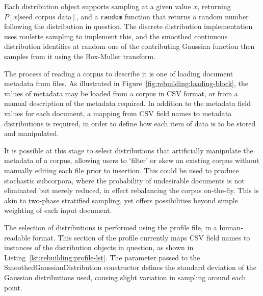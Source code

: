 Each distribution object supports sampling at a given value $x$, returning $P[x | \text{seed corpus data}]$, and a \texttt{random} function that returns a random number following the distribution in question.  The discrete distribution implementation uses roulette sampling to implement this, and the smoothed continuous distribution identifies at random one of the contributing Gaussian function then samples from it using the Box-Muller transform\cite{box1958}.

The process of reading a corpus to describe it is one of loading document metadata from files.  As illustrated in Figure~\ref{fig:rebuilding:loading-block}, the values of metadata may be loaded from a corpus in CSV format, or from a manual description of the metadata required.  In addition to the metadata field values for each document, a mapping from CSV field names to metadata distributions is required, in order to define how each item of data is to be stored and manipulated.

It is possible at this stage to select distributions that artificially manipulate the metadata of a corpus, allowing users to `filter' or skew an existing corpus without manually editing each file prior to insertion.  This could be used to produce stochastic subcorpora, where the probability of undesirable documents is not eliminated but merely reduced, in effect rebalancing the corpus on-the-fly.  This is akin to two-phase stratified sampling, yet offers possibilities beyond simple weighting of each input document.

The selection of distributions is performed using the profile file, in a human-readable format.  This section of the profile currently maps CSV field names to instances of the distribution objects in question, as shown in Listing~\ref{lst:rebuilding:profile-lst}.  The parameter passed to the SmoothedGaussianDistribution constructor defines the standard deviation of the Gaussian distributions used, causing slight variation in sampling around each point.


